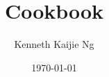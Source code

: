\documentclass[11pt]{article}
\title{Cookbook}
\author{Kenneth Kaijie Ng}
\date{\today\\\docversion}
\begin{document}
\begin{titlepage}
\maketitle
\end{titlepage}


\tableofcontents







\end{document}
